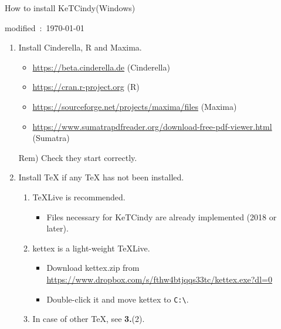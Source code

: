 \documentclass{article}
\begin{document}
\begin{center}
How to install KeTCindy(Windows)
\end{center}

\hfill modified\ :\ \today

\begin{enumerate}[\bf\large 1.]

\item Install Cinderella, R and Maxima.
 \begin{itemize}
 \item \url{https://beta.cinderella.de}  (Cinderella)
 \item \url{https://cran.r-project.org}   (R)
 \item \url{https://sourceforge.net/projects/maxima/files}  (Maxima)
 \item \url{https://www.sumatrapdfreader.org/download-free-pdf-viewer.html} (Sumatra)
 \end{itemize}
\hspace*{5mm}Rem) Check they start correctly.

\item Install TeX if any TeX has not been installed.
  \begin{enumerate}[(1)]
  \item TeXLive is recommended.
    \begin{itemize}
    \item Files necessary for KeTCindy are already implemented (2018 or later).
    \end{itemize}
  \item kettex is a light-weight TeXLive.
    \begin{itemize}
    \item Download kettex.zip from\\
    \hspace*{10mm}\url{https://www.dropbox.com/s/fthw4btjqqs33tc/kettex.exe?dl=0}
    \item Double-click it and move kettex to \verb|C:\|.
    \end{itemize}
  \item In case of other TeX, see {\bf 3.}(2).
 \end{enumerate}



\end{enumerate}
\end{document}
